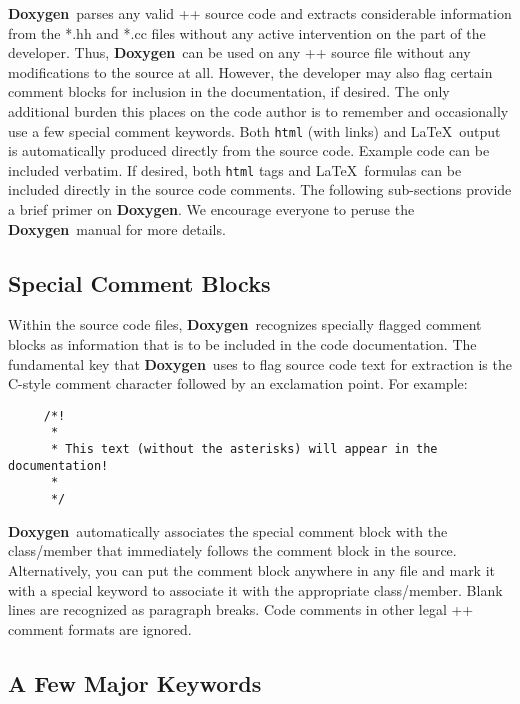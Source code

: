 \documentclass[11pt]{nmemo}
\newcommand{\doxy}{{\normalfont\bfseries Doxygen}}
\begin{document}
 
\doxy\ parses any valid \C++ source code and extracts considerable information from the *.hh
and *.cc files without any active intervention on the part of the developer.
Thus, \doxy\ can be used on any \C++ source file
without any modifications to the source at all. 
However, the developer may also flag certain
comment blocks for inclusion in the documentation, if desired.
The only additional burden this places on the code author is to 
remember and occasionally use a few
special comment keywords. Both \texttt{html} (with links)
and \LaTeX\ output is automatically produced directly from the source code.
Example code can be included verbatim. If desired, both  \texttt{html} tags and \LaTeX\
formulas can be included directly in the source code comments.  The following
sub-sections provide a brief primer on \doxy. We encourage everyone to peruse
the \doxy\ manual for more details.

\subsection{Special Comment Blocks}
\label{sec:spcom}

Within the source code files, 
\doxy\ recognizes specially flagged comment blocks as information
that is to be included in the code documentation.
The fundamental key that \doxy\ uses to flag source code text for
extraction is the C-style comment character followed by an exclamation
point. For example:
\begin{verbatim}
     /*!
      *
      * This text (without the asterisks) will appear in the documentation!
      *
      */
\end{verbatim}
\doxy\ automatically associates
the special comment block with the class/member that immediately follows the 
comment block in the source. Alternatively, you can put the comment block
anywhere in any file and mark it with a special keyword to associate it
with the appropriate class/member. Blank lines are recognized as paragraph
breaks. Code comments in other legal \C++ comment formats are ignored.

\subsection{A Few Major Keywords}
\end{document}
